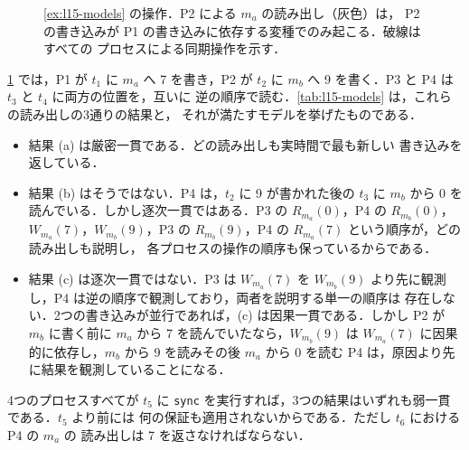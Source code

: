 \documentclass[../main.tex]{subfiles}
\begin{document}
\begin{figure}[htbp]
  \centering
  
  \caption{\cref{ex:l15-models} の操作．P2 による $m_a$ の読み出し（灰色）は，
    P2 の書き込みが P1 の書き込みに依存する変種でのみ起こる．破線はすべての
    プロセスによる同期操作を示す．}
  \label{fig:l15-models}
\end{figure}

\begin{example}
  \label{ex:l15-models}
  \cref{fig:l15-models} では，P1 が $t_1$ に $m_a$ へ 7 を書き，P2 が $t_2$
  に $m_b$ へ 9 を書く．P3 と P4 は $t_3$ と $t_4$ に両方の位置を，互いに
  逆の順序で読む．\cref{tab:l15-models} は，これらの読み出しの3通りの結果と，
  それが満たすモデルを挙げたものである．
  \begin{itemize}
    \item 結果 (a) は厳密一貫である．どの読み出しも実時間で最も新しい
      書き込みを返している．
    \item 結果 (b) はそうではない．P4 は，$t_2$ に 9 が書かれた後の $t_3$ に
      $m_b$ から 0 を読んでいる．しかし逐次一貫ではある．P3 の
      $R_{m_a}(0)$，P4 の $R_{m_b}(0)$，$W_{m_a}(7)$，$W_{m_b}(9)$，P3 の
      $R_{m_b}(9)$，P4 の $R_{m_a}(7)$ という順序が，どの読み出しも説明し，
      各プロセスの操作の順序も保っているからである．
    \item 結果 (c) は逐次一貫ではない．P3 は $W_{m_a}(7)$ を $W_{m_b}(9)$
      より先に観測し，P4 は逆の順序で観測しており，両者を説明する単一の順序は
      存在しない．2つの書き込みが並行であれば，(c) は因果一貫である．しかし
      P2 が $m_b$ に書く前に $m_a$ から 7 を読んでいたなら，$W_{m_b}(9)$ は
      $W_{m_a}(7)$ に因果的に依存し，$m_b$ から 9 を読みその後 $m_a$ から
      0 を読む P4 は，原因より先に結果を観測していることになる．%
  \end{itemize}
  4つのプロセスすべてが $t_5$ に \texttt{sync} を実行すれば，3つの結果はいずれも弱一貫である．$t_5$ より前には
  何の保証も適用されないからである．ただし $t_6$ における P4 の $m_a$ の
  読み出しは 7 を返さなければならない．
\end{example}
\end{document}
